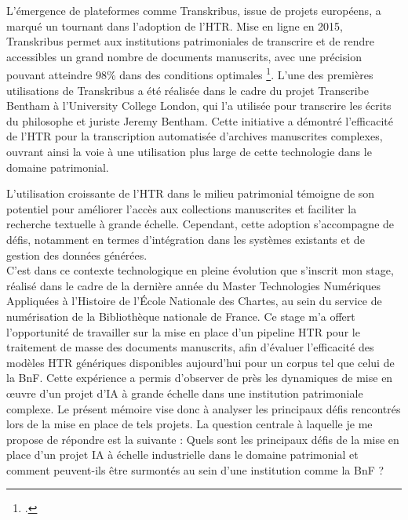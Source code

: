 \documentclass[a4paper,12pt,twoside]{book}
\begin{document}
L'émergence de plateformes comme Transkribus, issue de projets européens, a marqué un tournant dans l'adoption de l'HTR. Mise en ligne en 2015, Transkribus permet aux institutions patrimoniales de transcrire et de rendre accessibles un grand nombre de documents manuscrits, avec une précision pouvant atteindre 98\% dans des conditions optimales \footcite{terras_role_2022}. L’une des premières utilisations de Transkribus a été réalisée dans le cadre du projet Transcribe Bentham à l’University College London, qui l’a utilisée pour transcrire les écrits du philosophe et juriste Jeremy Bentham. Cette initiative a démontré l’efficacité de l’HTR pour la transcription automatisée d’archives manuscrites complexes, ouvrant ainsi la voie à une utilisation plus large de cette technologie dans le domaine patrimonial.

L'utilisation croissante de l'HTR dans le milieu patrimonial témoigne de son potentiel pour améliorer l'accès aux collections manuscrites et faciliter la recherche textuelle à grande échelle. Cependant, cette adoption s'accompagne de défis, notamment en termes d'intégration dans les systèmes existants et de gestion des données générées.
\\

C’est dans ce contexte technologique en pleine évolution que s’inscrit
mon stage, réalisé dans le cadre de la dernière année du Master Technologies
Numériques Appliquées à l’Histoire de l’École Nationale des Chartes, au sein
du service de numérisation de la Bibliothèque nationale de France. Ce
stage m’a offert l’opportunité de travailler sur la mise en place d’un pipeline
HTR pour le traitement de masse des documents manuscrits, afin d’évaluer
l’efficacité des modèles HTR génériques disponibles aujourd’hui pour un
corpus tel que celui de la BnF. Cette expérience a permis d’observer de près les
dynamiques de mise en œuvre d’un projet d’IA à grande échelle dans une
institution patrimoniale complexe. Le présent mémoire vise donc à analyser les
principaux défis rencontrés lors de la mise en place de tels projets. La question
centrale à laquelle je me propose de répondre est la suivante : Quels sont les
principaux défis de la mise en place d’un projet IA à échelle industrielle dans le
domaine patrimonial et comment peuvent-ils être surmontés au sein d’une
institution comme la BnF ?
\end{document}
